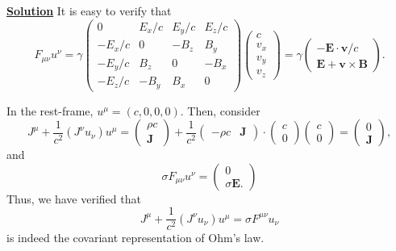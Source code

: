 \noindent \underline{\textbf{Solution}} It is easy to verify that 
\begin{equation}
    F_{\mu\nu}u^\nu = \gamma\begin{pmatrix}
  0        &  E_x/c &  E_y/c &  E_z/c \\
  -E_x/c  &  0     & -B_z   &  B_y   \\
  -E_y/c  &  B_z   &  0     & -B_x   \\
  -E_z/c  & -B_y   &  B_x   &  0
\end{pmatrix}
\begin{pmatrix}
    c\\v_x\\v_y\\v_z
\end{pmatrix} = 
   \gamma\begin{pmatrix}-\mathbf{E}\cdot\mathbf{v}/c\\
  \mathbf{E}+\mathbf{v}\times\mathbf{B}\end{pmatrix}.
\end{equation}

In the rest-frame, $u^\mu = (c,0,0,0)$. Then, consider
\begin{equation}
    J^\mu + \frac{1}{c^2}(J^\nu u_\nu)u^\mu = \begin{pmatrix}
        \rho c\\\mathbf{J}
    \end{pmatrix}+\frac{1}{c^2}\begin{pmatrix}
        -\rho c &\mathbf{J}
    \end{pmatrix}\cdot\begin{pmatrix}
        c\\0
    \end{pmatrix}\begin{pmatrix}
        c\\0
    \end{pmatrix} = \begin{pmatrix}
        0\\\mathbf{J}
    \end{pmatrix},
\end{equation}
and
\begin{equation}
    \sigma F_{\mu\nu}u^\nu = \begin{pmatrix}
        0\\\sigma\mathbf{E}.
    \end{pmatrix}
\end{equation}
Thus, we have verified that 
\begin{equation}
  J^\mu + \frac{1}{c^2}(J^\nu u_\nu)u^\mu = \sigma F^{\mu\nu}u_\nu
\end{equation}
is indeed the covariant representation of Ohm's law.

